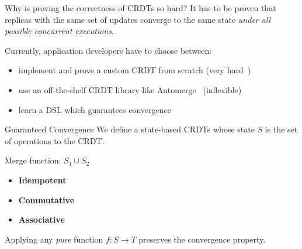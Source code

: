 \documentclass[USenglish,aspectratio=169]{beamer} %
\begin{document}
\begin{frame}
    \begin{itemize}
    \end{itemize}
\end{frame}

\begin{frame}{Why is proving the correctness of \acsp{CRDT} so hard?}
    It has to be proven that replicas with the same set of updates
    converge to the same state \emph{under all possible concurrent executions}.

    \pause
    Currently, application developers have to choose between:
    \begin{itemize}
        \item implement and prove a custom \ac{CRDT} from scratch
              (very hard~\cite{kleppmann2022assessing,gomes2017verifying})
        \item use an off-the-shelf \ac{CRDT} library like Automerge~\cite{automerge}
              (inflexible)
        \item learn a \acs{DSL} which guarantees convergence~\cite{verifx,lore,propel}
    \end{itemize}
\end{frame}

\begin{frame}{Guaranteed Convergence}
    We define a state-based \acsp{CRDT} whose state \(S\) is the set
    of operations to the \ac{CRDT}.

    Merge function: \( S_1 \cup S_2 \)
    \begin{itemize}
        \item[\checkmark] \textbf{Idempotent}
        \item[\checkmark] \textbf{Commutative}
        \item[\checkmark] \textbf{Associative}
    \end{itemize}

    Applying any \emph{pure} function \(f: S \to T\) preserves the convergence property.
\end{frame}
\end{document}
